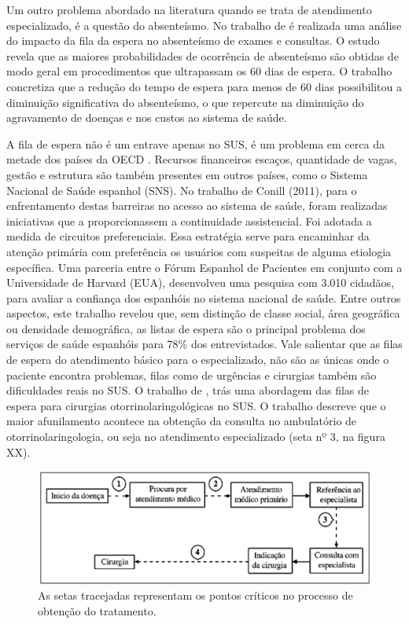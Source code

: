     Um outro problema abordado na literatura quando se trata de atendimento especializado, é a questão do absenteísmo. No trabalho de \cite{URSULA2018} é realizada uma análise do impacto da fila da espera no absenteísmo de exames e consultas. O estudo revela que as maiores
    probabilidades de ocorrência de absenteísmo são obtidas de modo geral em
    procedimentos que ultrapassam os 60 dias de espera. O trabalho concretiza que a redução do tempo de espera para menos de 60 dias possibilitou a diminuição significativa do absenteísmo, o que repercute na diminuição do agravamento de doenças e nos custos ao sistema de saúde. 
    
    A fila de espera não é um entrave apenas no SUS, é um problema em cerca da metade dos países da OECD \cite{SICILIANI2004}. Recursos financeiros escaços, quantidade de vagas, gestão e estrutura são também presentes em outros países, como o Sistema Nacional de Saúde espanhol (SNS). No trabalho de Conill (2011), para o enfrentamento destas barreiras no acesso ao sistema de saúde, foram realizadas iniciativas que a proporcionassem a continuidade assistencial. Foi adotada a medida de circuitos preferenciais. Essa estratégia serve para encaminhar da atenção primária com preferência os usuários com suspeitas de alguma etiologia específica. Uma parceria entre o Fórum Espanhol de Pacientes em conjunto com a Universidade de Harvard (EUA), desenvolveu uma pesquisa com 3.010 cidadãos, para avaliar a confiança dos espanhóis no sistema nacional de saúde. Entre outros aspectos, este trabalho revelou que, sem distinção de classe social, área geográfica ou densidade demográfica, as listas de espera são o principal problema dos serviços de saúde espanhóis para 78\% dos entrevistados.  
    Vale salientar que as filas de espera do atendimento básico para o especializado, não são as únicas onde o paciente encontra problemas, filas como de urgências e cirurgias também são dificuldades reais no SUS. O trabalho de , trás uma abordagem das filas de espera para cirurgias otorrinolaringológicas no SUS. O trabalho descreve que o maior afunilamento acontece na obtenção da consulta no ambulatório de otorrinolaringologia, ou seja no atendimento especializado (seta nº 3, na figura XX).
    
    \begin{figure}[htbp]
        	\centering
            \caption{As setas tracejadas representam os pontos críticos no processo de obtenção do tratamento.}
            \label{fig:images/fluxo-fila-cirurgia-otorrino}
            \includegraphics[width=0.9\linewidth]{images/fluxo-fila-cirurgia-otorrino.png}
        \end{figure}
        
